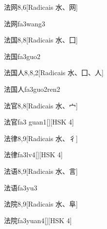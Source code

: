 \begin{entry}{法网}{8,6}[Radicais ⽔、⽹]
  \begin{phonetics}{法网}{fa3wang3}
  \end{phonetics}
\end{entry}

\begin{entry}{法国}{8,8}[Radicais ⽔、⼞]
  \begin{phonetics}{法国}{fa3guo2}
  \end{phonetics}
\end{entry}

\begin{entry}{法国人}{8,8,2}[Radicais ⽔、⼞、⼈]
  \begin{phonetics}{法国人}{fa3guo2ren2}
  \end{phonetics}
\end{entry}

\begin{entry}{法官}{8,8}[Radicais ⽔、⼧]
  \begin{phonetics}{法官}{fa3 guan1}[][HSK 4]
  \end{phonetics}
\end{entry}

\begin{entry}{法律}{8,9}[Radicais ⽔、⼻]
  \begin{phonetics}{法律}{fa3lv4}[][HSK 4]
  \end{phonetics}
\end{entry}

\begin{entry}{法语}{8,9}[Radicais ⽔、⾔]
  \begin{phonetics}{法语}{fa3yu3}
  \end{phonetics}
\end{entry}

\begin{entry}{法院}{8,9}[Radicais ⽔、⾩]
  \begin{phonetics}{法院}{fa3yuan4}[][HSK 4]
  \end{phonetics}
\end{entry}


